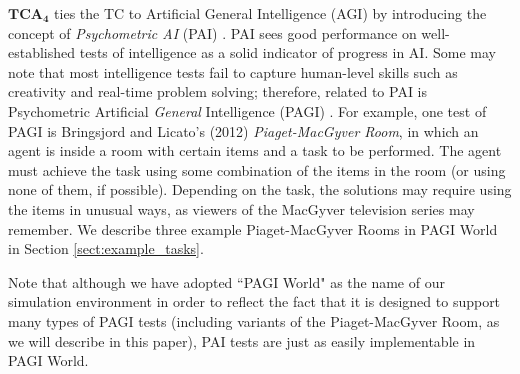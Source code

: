 $\mathbf{TCA_4}$ ties the TC to Artificial General Intelligence (AGI) by introducing the concept of \textit{Psychometric AI} (PAI) \cite{Bringsjord2011,Bringsjord2003b}. PAI sees good performance on well-established tests of intelligence as a solid indicator of progress in AI. Some may note that most intelligence tests fail to capture human-level skills such as creativity and real-time problem solving; therefore, related to PAI is Psychometric Artificial \textit{General} Intelligence (PAGI) \cite{Bringsjord2012}. For example, one test of PAGI is Bringsjord and Licato's (2012) \textit{Piaget-MacGyver Room}, in which an agent is inside a room with certain items and a task to be performed. The agent must achieve the task using some combination of the items in the room (or using none of them, if possible). Depending on the task, the solutions may require using the items in unusual ways, as viewers of the MacGyver television series may remember. We describe three example Piaget-MacGyver Rooms in PAGI World in Section \ref{sect:example_tasks}.

Note that although we have adopted ``PAGI World" as the name of our simulation environment in order to reflect the fact that it is designed to support many types of PAGI tests (including variants of the Piaget-MacGyver Room, as we will describe in this paper), PAI tests are just as easily implementable in PAGI World.
